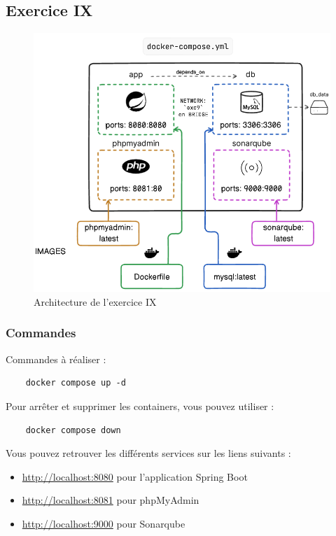 \subsection*{Exercice IX}
\begin{figure}[hbtp]
    \centering
    \includegraphics[width=\textwidth]{images/exo9.png}
    \caption{Architecture de l'exercice IX}
    \label{fig:exo9}
\end{figure}
\subsubsection*{Commandes}
Commandes à réaliser :
    
\begin{verbatim}
    docker compose up -d
\end{verbatim}
Pour arrêter et supprimer les containers, vous pouvez utiliser :

\begin{verbatim}
    docker compose down
\end{verbatim}
Vous pouvez retrouver les différents services sur les liens suivants :
\begin{itemize}
    \item \href{http://localhost:8080}{http://localhost:8080} pour l'application Spring Boot
    \item \href{http://localhost:8081}{http://localhost:8081} pour phpMyAdmin
    \item \href{http://localhost:9000}{http://localhost:9000} pour 
    Sonarqube
\end{itemize}


